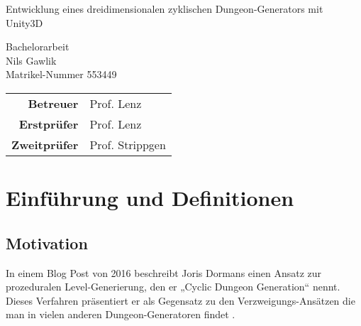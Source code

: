 
\pagestyle{empty} %

\clearscrheadings\clearscrplain
\begin{center}
\begin{Huge}
Entwicklung eines dreidimensionalen zyklischen Dungeon-Generators mit Unity3D\\
\end{Huge}
\vspace{8mm}
Bachelorarbeit\\
\vspace{0.4cm}
\vspace{2 cm}
Nils Gawlik \\
Matrikel-Nummer 553449\\
\vspace{8cm}
\begin{tabular}{rl}
{\bfseries Betreuer} & Prof. Lenz \\
{\bfseries Erstprüfer}& Prof. Lenz\\
{\bfseries Zweitprüfer}& Prof. Strippgen\\
\end{tabular}

\end{center}
\clearpage


\pagestyle{useheadings} %

\tableofcontents %
\listoffigures %
\clearpage

\chapter{Einführung und Definitionen}

\section{Motivation}

In einem Blog Post von 2016 beschreibt Joris Dormans einen Ansatz zur prozeduralen Level-Generierung, den er „Cyclic Dungeon Generation“ nennt. Dieses Verfahren präsentiert er als Gegensatz zu den Verzweigungs-Ansätzen die man in vielen anderen Dungeon-Generatoren findet \cite{blogCyclic}.

